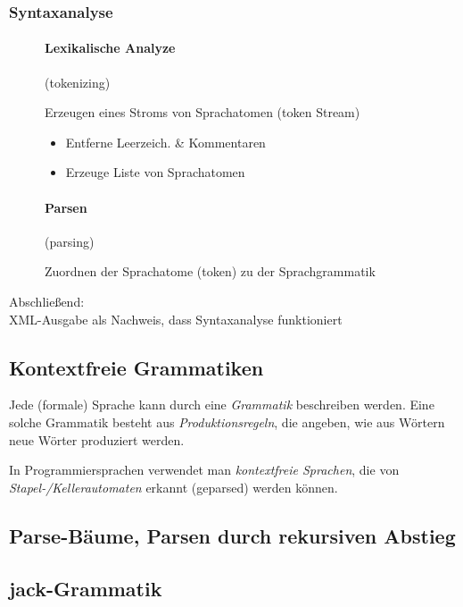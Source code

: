 \documentclass[12pt]{report}
\begin{document}
\subsubsection{Syntaxanalyse}
\begin{figure}[H]
  \begin{minipage}[t]{0.45\textwidth}
    \paragraph{Lexikalische Analyze} (tokenizing)
    
    Erzeugen eines Stroms von Sprachatomen (token Stream)
    \begin{itemize}
      \item Entferne Leerzeich. \& Kommentaren
      \item Erzeuge Liste von Sprachatomen
    \end{itemize}
  \end{minipage}
  \hfill
  \begin{minipage}[t]{0.45\textwidth}
    \paragraph{Parsen} (parsing)
    
    Zuordnen der Sprachatome (token) zu der Sprachgrammatik 
  \end{minipage}
\end{figure}
\begin{center}
  Abschließend: \\
  XML-Ausgabe als Nachweis, dass Syntaxanalyse funktioniert
\end{center}

\subsection{Kontextfreie Grammatiken}
Jede (formale) Sprache kann durch eine \textit{Grammatik} beschreiben werden.
Eine solche Grammatik besteht aus \textit{Produktionsregeln}, die angeben, 
wie aus Wörtern neue Wörter produziert werden.

In Programmiersprachen verwendet man \textit{kontextfreie Sprachen}, die von
\textit{Stapel-/Kellerautomaten} erkannt (geparsed) werden können.

\subsection{Parse-Bäume, Parsen durch rekursiven Abstieg}
\subsection{jack-Grammatik}
\end{document}
